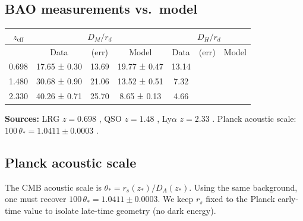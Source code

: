\documentclass[aps,prd,reprint,onecolumn,nofootinbib]{revtex4-2}
\begin{document}
\subsection*{BAO measurements vs.\ model}
\begin{center}
\begin{tabular}{c|ccc|ccc}
$z_\mathrm{eff}$ & \multicolumn{3}{c|}{$D_M/r_d$} & \multicolumn{3}{c}{$D_H/r_d$} \\
\hline
 & Data & (err) & Model & Data & (err) & Model \\
\hline
0.698 & 17.65 ± 0.30 & 13.69 & 19.77 ± 0.47 & 13.14 \\
1.480 & 30.68 ± 0.90 & 21.06 & 13.52 ± 0.51 & 7.32 \\
2.330 & 40.26 ± 0.71 & 25.70 & 8.65 ± 0.13 & 4.66 \\
\end{tabular}
\end{center}

\noindent\textbf{Sources:} LRG $z\!=\!0.698$ \cite{Bautista2020LRG}, QSO $z\!=\!1.48$ \cite{Neveux2020QSO}, Ly$\alpha$ $z\!=\!2.33$ \cite{Cuceu2023LyA,duMas2020LyA}. Planck acoustic scale: $100\,\theta_\ast=1.0411\pm0.0003$ \cite{Planck2018}.

\subsection*{Planck acoustic scale}
The CMB acoustic scale is $\theta_\ast=r_s(z_\ast)/D_A(z_\ast)$. Using the same background, one must recover $100\,\theta_\ast=1.0411\pm0.0003$. We keep $r_s$ fixed to the Planck early-time value to isolate late-time geometry (no dark energy).
\end{document}
